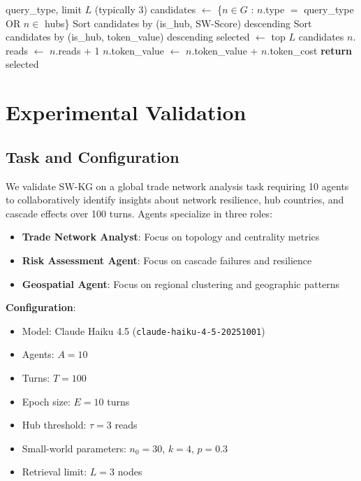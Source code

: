 \documentclass[11pt]{article}
\begin{document}
\begin{algorithm}
\caption{Knowledge Retrieval}
\begin{algorithmic}[1]
\REQUIRE query\_type, limit $L$ (typically 3)
\STATE candidates $\leftarrow$ \{$n \in G$ : $n.$type $=$ query\_type OR $n \in$ hubs\}
    \STATE Sort candidates by (is\_hub, SW-Score) descending
\ELSE
    \STATE Sort candidates by (is\_hub, token\_value) descending 
\ENDIF
\STATE selected $\leftarrow$ top $L$ candidates
    \STATE $n.$reads $\leftarrow$ $n.$reads + 1
    \STATE $n.$token\_value $\leftarrow$ $n.$token\_value + $n.$token\_cost
\ENDFOR
\STATE \textbf{return} selected
\end{algorithmic}
\end{algorithm}

\section{Experimental Validation}

\subsection{Task and Configuration}

We validate SW-KG on a global trade network analysis task requiring 10 agents to collaboratively identify insights about network resilience, hub countries, and cascade effects over 100 turns. Agents specialize in three roles:
\begin{itemize}
    \item \textbf{Trade Network Analyst}: Focus on topology and centrality metrics
    \item \textbf{Risk Assessment Agent}: Focus on cascade failures and resilience
    \item \textbf{Geospatial Agent}: Focus on regional clustering and geographic patterns
\end{itemize}

\textbf{Configuration}:
\begin{itemize}
    \item Model: Claude Haiku 4.5 (\texttt{claude-haiku-4-5-20251001})
    \item Agents: $A = 10$
    \item Turns: $T = 100$
    \item Epoch size: $E = 10$ turns
    \item Hub threshold: $\tau = 3$ reads
    \item Small-world parameters: $n_0 = 30$, $k = 4$, $p = 0.3$
    \item Retrieval limit: $L = 3$ nodes
\end{itemize}
\end{document}

